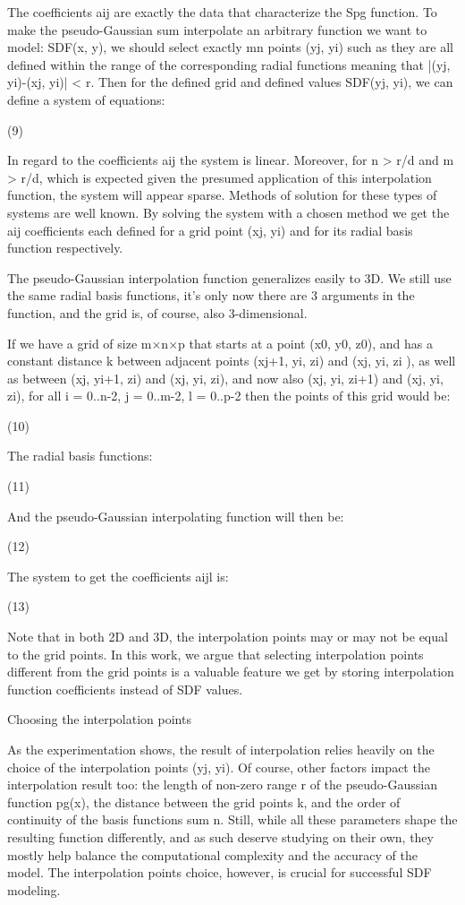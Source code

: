 \documentclass[12pt,a4paper]{article}
\begin{document}
\par
The coefficients aij are exactly the data that characterize the Spg function. To make the pseudo-Gaussian sum interpolate an arbitrary function we want to model: SDF(x, y), we should select exactly mn points (yj, yi) such as they are all defined within the range of the corresponding radial functions meaning that |(yj, yi)-(xj, yi)| < r. Then for the defined grid and defined values SDF(yj, yi), we can define a system of equations:
\par
(9)
\par
In regard to the coefficients aij the system is linear. Moreover, for n > r/d and m > r/d, which is expected given the presumed application of this interpolation function, the system will appear sparse. Methods of solution for these types of systems are well known. By solving the system with a chosen method we get the aij coefficients each defined for a grid point (xj, yi) and for its radial basis function respectively.
\par
The pseudo-Gaussian interpolation function generalizes easily to 3D. We still use the same radial basis functions, it’s only now there are 3 arguments in the function, and the grid is, of course, also 3-dimensional.
\par
If we have a grid of size m×n×p that starts at a point (x0, y0, z0), and has a constant distance k between adjacent points (xj+1, yi, zi) and (xj, yi, zi ), as well as between (xj, yi+1, zi) and (xj, yi, zi), and now also (xj, yi, zi+1) and (xj, yi, zi), for all i = 0..n-2, j = 0..m-2, l = 0..p-2 then the points of this grid would be:
\par
(10)
\par
The radial basis functions:
\par
(11)
\par
And the pseudo-Gaussian interpolating function will then be:
\par
(12)
\par
The system to get the coefficients aijl is:
\par
(13)
\par
Note that in both 2D and 3D, the interpolation points may or may not be equal to the grid points. In this work, we argue that selecting interpolation points different from the grid points is a valuable feature we get by storing interpolation function coefficients instead of SDF values.
\par
Choosing the interpolation points
\par
As the experimentation shows, the result of interpolation relies heavily on the choice of the interpolation points (yj, yi). Of course, other factors impact the interpolation result too: the length of non-zero range r of the pseudo-Gaussian function pg(x), the distance between the grid points k, and the order of continuity of the basis functions sum n. Still, while all these parameters shape the resulting function differently, and as such deserve studying on their own, they mostly help balance the computational complexity and the accuracy of the model. The interpolation points choice, however, is crucial for successful SDF modeling.
\end{document}
